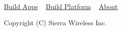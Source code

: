 \hyperlink{buildAppsMain}{Build Apps} ~\newline
 \hyperlink{buildPlatformMain}{Build Platform} ~\newline
 \hyperlink{aboutMain}{About} ~\newline


Copyright (C) Sierra Wireless Inc. 
